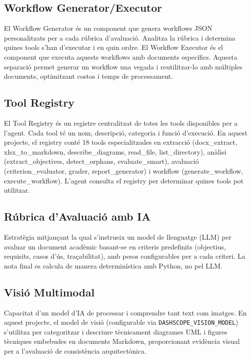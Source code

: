 \documentclass[12pt,a4paper,twoside]{report}
\begin{document}
\subsection{Workflow Generator/Executor}
\label{subsec:workflow}

El Workflow Generator \'es un component que genera workflows JSON personalitzats per a cada r\'ubrica d'avaluaci\'o. Analitza la r\'ubrica i determina quines tools s'han d'executar i en quin ordre. El Workflow Executor \'es el component que executa aquests workflows amb documents espec\'ifics. Aquesta separaci\'o permet generar un workflow una vegada i reutilitzar-lo amb m\'ultiples documents, optimitzant costos i temps de processament.

\subsection{Tool Registry}
\label{subsec:tool-registry}

El Tool Registry \'es un registre centralitzat de totes les tools disponibles per a l'agent. Cada tool t\'e un nom, descripci\'o, categoria i funci\'o d'execuci\'o. En aquest projecte, el registry cont\'e 18 tools especialitzades en extracci\'o (docx\_extract, xlsx\_to\_markdown, describe\_diagrams, read\_file, list\_directory), an\`alisi (extract\_objectives, detect\_orphans, evaluate\_smart), avaluaci\'o (criterion\_evaluator, grader, report\_generator) i workflow (generate\_workflow, execute\_workflow). L'agent consulta el registry per determinar quines tools pot utilitzar.

\subsection{R\'ubrica d'Avaluaci\'o amb IA}
\label{subsec:rubrica-ia}

Estrat\`egia mitjan\c{c}ant la qual s'instrueix un model de llenguatge (LLM) per avaluar un document acad\`emic basant-se en criteris predefinits (objectius, requisits, casos d'\'us, tra\c{c}abilitat), amb pesos configurables per a cada criteri. La nota final es calcula de manera determin\'istica amb Python, no pel LLM.

\subsection{Visi\'o Multimodal}
\label{subsec:visio-multimodal}

Capacitat d'un model d'IA de processar i comprendre tant text com imatges. En aquest projecte, el model de visi\'o (configurable via \texttt{DASHSCOPE\_VISION\_MODEL}) s'utilitza per categoritzar i descriure t\`ecnicament diagrames UML i figures t\`ecniques embebudes en documents Markdown, proporcionant evid\`encia visual per a l'avaluaci\'o de consist\`encia arquitect\`onica.
\end{document}
